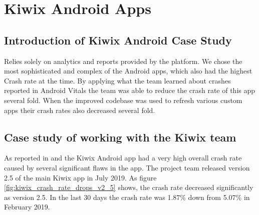 \section{Kiwix Android Apps}
\label{section-kiwix-case-study}
\subsection{Introduction of Kiwix Android Case Study}

Relies solely on analytics and reports provided by the platform. We chose the most sophisticated and complex of the Android apps, which also had the highest Crash rate at the time. By applying what the team learned about crashes reported in Android Vitals the team was able to reduce the crash rate of this app several fold. When the improved codebase was used to refresh various custom apps their crash rates also decreased several fold.


\subsection{Case study of working with the Kiwix team}
As reported in \cite{harty_google_play_console_insightful_development_using_android_vitals_and_pre_launch_reports} and \cite{harty_better_android_apps_using_android_vitals} the Kiwix Android app had a very high overall crash rate caused by several significant flaws in the app. The project team released version 2.5 of the main Kiwix app in July 2019. As figure \ref{fig:kiwix_crash_rate_drops_v2_5} shows, the crash rate decreased significantly as version 2.5. In the last 30 days the crash rate was 1.87\% down from 5.07\% in February 2019.

